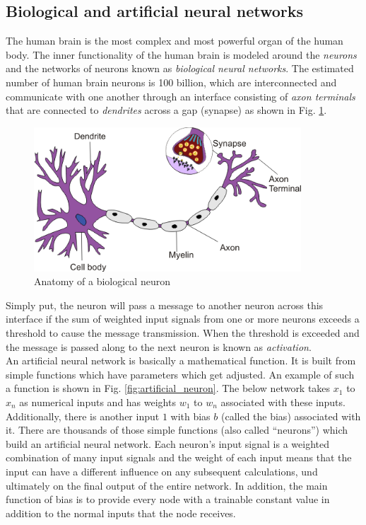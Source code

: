 \subsection{Biological and artificial neural networks}
The human brain is the most complex and most powerful organ of the human body. The inner functionality of the human brain is modeled around the \textit{neurons} and the networks of neurons known as \textit{biological neural networks}. The estimated number of human brain neurons is 100 billion, which are interconnected and communicate with one another through an interface consisting of \textit{axon terminals} that are connected to \textit{dendrites} across a gap (synapse) as shown in Fig. \ref{fig:biological_neuron}. 
\begin{figure}[h!]
\includegraphics[width=10cm,center,keepaspectratio]{figures/biological_neuron}
\caption{Anatomy of a biological neuron \cite{fig:biological_neuron}}
\label{fig:biological_neuron}
\end{figure}
Simply put, the neuron will pass a message to another neuron across this interface if the sum of weighted input signals from one or more neurons exceeds a threshold to cause the message transmission. When the threshold is exceeded and the message is passed along to the next neuron is known as \textit{activation}.\\
An artificial neural network is basically a mathematical function. It is built from simple functions which have parameters which get adjusted. An example of such a function is shown in Fig. \ref{fig:artificial_neuron}. The below network takes $x_1$ to $x_n$ as numerical inputs and has weights $w_1$ to $w_n$ associated with these inputs. Additionally, there is another input $1$ with bias $b$ (called the bias) associated with it. There are thousands of those simple functions (also called ``neurons'') which build an artificial neural network. Each neuron's input signal is a weighted combination of many input signals and the weight of each input means that the input can have a different influence  on any subsequent calculations, und ultimately on the final output of the entire network. In addition, the main function of bias is to provide every node with a trainable constant value in addition to the normal inputs that the node receives. \\
